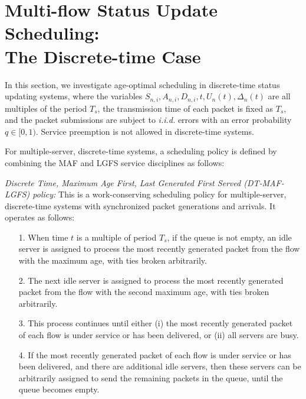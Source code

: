 \section{Multi-flow Status Update Scheduling: \\ The Discrete-time Case}
In this section, we investigate age-optimal scheduling in discrete-time status updating systems, where the variables $S_{n,i}, A_{n,i}, D_{n,i}, t, U_{n} (t), \Delta_{n} (t)$ are all multiples of the period $T_s$, the transmission time of each packet is fixed as $T_s$, and the packet submissions are subject to \emph{i.i.d.} errors with an error probability $q\in[0,1)$. Service preemption is not allowed in discrete-time systems.

For multiple-server, discrete-time systems, a scheduling policy is defined by combining the MAF and LGFS service disciplines as follows:


\begin{definition} \emph{Discrete Time, Maximum Age First, Last Generated First Served (DT-MAF-LGFS) policy:} This is a work-conserving scheduling policy for multiple-server, discrete-time systems with synchronized packet generations and arrivals. It operates as follows:

\begin{itemize}
\item[1.] When  time $t$ is a multiple of period $T_s$, if the queue is not empty, an idle server is assigned to process the most recently generated packet from the flow with the maximum age, with ties broken arbitrarily. 

\item[2.] The next  idle server is assigned to process the most recently generated packet from the flow with the second maximum age, with ties broken arbitrarily. 

\item[3.] This process continues until either (i) the most recently generated packet of each flow is under service or has been delivered, or (ii) all servers are busy. 

\item[4.] If the most recently generated packet of each flow is under service or has been delivered, and there are additional idle servers, then these servers can be arbitrarily assigned to send the remaining packets in the queue, until the queue becomes empty.
\end{itemize}
\end{definition}

